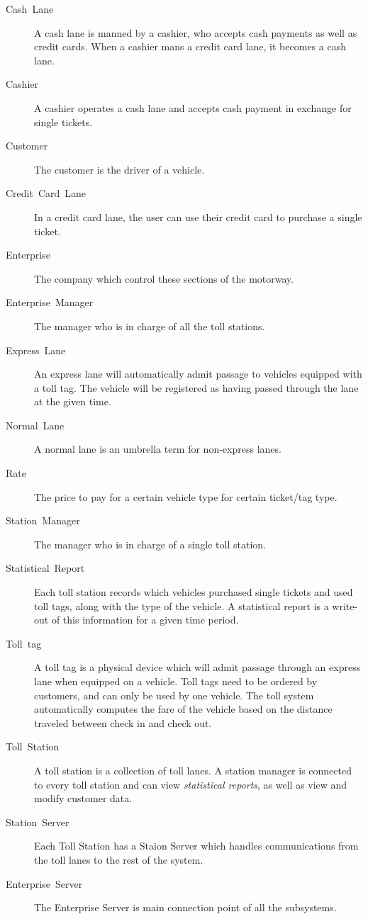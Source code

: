 \begin{description}
\item [{Cash~Lane}] A cash lane is manned by a cashier, who accepts cash
payments as well as credit cards. When a cashier mans a credit card
lane, it becomes a cash lane.

\item [{Cashier}] A cashier operates a cash lane and accepts cash payment
in exchange for single tickets.

\item [{Customer}] The customer is the driver of a vehicle.

\item [{Credit~Card~Lane}] In a credit card lane, the user can use their
credit card to purchase a single ticket.

\item [{Enterprise}] The company which control these sections of the motorway.

\item [{Enterprise~Manager}] The manager who is in charge of all the toll stations.

\item [{Express~Lane}] An express lane will automatically admit passage
to vehicles equipped with a toll tag. The vehicle will be registered
as having passed through the lane at the given time.

\item [{Normal~Lane}] A normal lane is an umbrella term for non-express lanes.

\item [{Rate}] The price to pay for a certain vehicle type for certain ticket/tag type.

\item [{Station~Manager}] The manager who is in charge of a single toll station.

\item [{Statistical~Report}] Each toll station records which vehicles
purchased single tickets and used toll tags, along with the type of
the vehicle. A statistical report is a write-out of this information
for a given time period.

\item [{Toll~tag}] A toll tag is a physical device which will admit passage
through an express lane when equipped on a vehicle. Toll tags need
to be ordered by customers, and can only be used by one vehicle. The
toll system automatically computes the fare of the vehicle based on
the distance traveled between check in and check out.

\item [{Toll~Station}] A toll station is a collection of toll lanes. A
station manager is connected to every toll station and can view \emph{statistical
reports}, as well as view and modify customer data.

\item [{Station~Server}] Each Toll Station has a Staion Server which handles communications from the toll lanes to the rest of the system.

\item [{Enterprise~Server}] The Enterprise Server is main connection point of all the subsystems.

\end{description}
